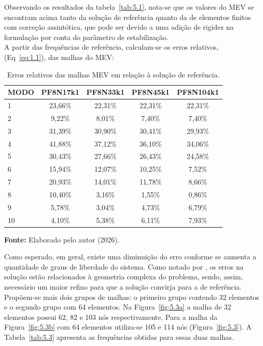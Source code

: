 \indent Observando os resultados da tabela~\ref{tab:5.1}, nota-se que os valores do MEV se encontram acima tanto da solução de referência quanto da de elementos finitos com correção assintótica, que pode ser devido a uma adição de rigidez na formulação por conta do parâmetro de estabilização. \\
\indent A partir das frequências de referência, calculam-se os erros relativos, (Eq~\ref{eq:1.1}), das malhas do MEV:

\begin{table}[htbp]
    \centering
    \caption{Erros relativos das malhas MEV em relação à solução de referência.}
    \label{tab:5.2}
    \small %
    \begin{tabular}{lcccc}
        \toprule
        \textbf{MODO} & \textbf{PF8N17k1} & \textbf{PF8N33k1} & \textbf{PF8N45k1} & \textbf{PF8N104k1} \\
        \midrule
        1  & 23,66\% & 22,31\% & 22,31\% & 22,31\% \\
        2  & 9,22\%  & 8,01\%  & 7,40\%  & 7,40\%  \\
        3  & 31,39\% & 30,90\% & 30,41\% & 29,93\% \\
        4  & 41,88\% & 37,12\% & 36,10\% & 34,06\% \\
        5  & 30,43\% & 27,66\% & 26,43\% & 24,58\% \\
        6  & 15,94\% & 12,07\% & 10,25\% & 7,52\%  \\
        7  & 20,93\% & 14,01\% & 11,78\% & 8,66\%  \\
        8  & 10,40\% & 3,16\%  & 1,55\%  & 0,86\%  \\
        9  & 5,78\%  & 3,04\%  & 4,73\%  & 6,79\%  \\
        10 & 4,10\%  & 5,38\%  & 6,11\%  & 7,93\%  \\
        \bottomrule
    \end{tabular}
    
    \vspace{0.2cm}
    \raggedright
    \textbf{Fonte:} Elaborado pelo autor (2026).
\end{table}

\indent Como esperado, em geral, existe uma diminuição do erro conforme se aumenta a quantidade de graus de liberdade do sistema. Como notado por \citet{cittadin2020enriquecimento}, os erros na solução estão relacionados à geometria complexa do problema, sendo, assim, necessário um maior refino para que a solução convirja para a de referência. Propõem-se mais dois grupos de malhas: o primeiro grupo contendo 32 elementos e o segundo grupo com 64 elementos. Na Figura~\ref{fig:5.3a} a malha de 32 elementos possui 62, 82 e 103 nós respectivamente. Para a malha da Figura~\ref{fig:5.3b} com 64 elementos utiliza-se 105 e 114 nós (Figura~\ref{fig:5.3}). A Tabela~\ref{tab:5.3} apresenta as frequências obtidas para essas duas malhas.

